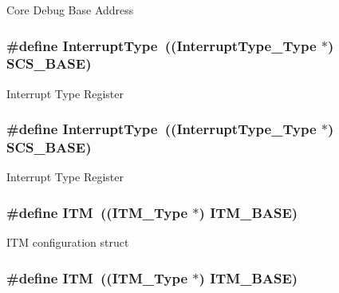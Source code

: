 Core Debug Base Address \hypertarget{group___c_m_s_i_s___c_m3__core__register_ga164238adbad56f07c7dd4e912af748dd}{
\subsubsection[{Interrupt\-Type}]{\setlength{\rightskip}{0pt plus 5cm}\#define Interrupt\-Type~(({\bf Interrupt\-Type\-\_\-\-Type} $\ast$) {\bf S\-C\-S\-\_\-\-B\-A\-S\-E})}}\label{group___c_m_s_i_s___c_m3__core__register_ga164238adbad56f07c7dd4e912af748dd}
Interrupt Type Register \hypertarget{group___c_m_s_i_s___c_m3__core__register_ga164238adbad56f07c7dd4e912af748dd}{
\subsubsection[{Interrupt\-Type}]{\setlength{\rightskip}{0pt plus 5cm}\#define Interrupt\-Type~(({\bf Interrupt\-Type\-\_\-\-Type} $\ast$) {\bf S\-C\-S\-\_\-\-B\-A\-S\-E})}}\label{group___c_m_s_i_s___c_m3__core__register_ga164238adbad56f07c7dd4e912af748dd}
Interrupt Type Register \hypertarget{group___c_m_s_i_s___c_m3__core__register_gabae7cdf882def602cb787bb039ff6a43}{
\subsubsection[{I\-T\-M}]{\setlength{\rightskip}{0pt plus 5cm}\#define I\-T\-M~(({\bf I\-T\-M\-\_\-\-Type} $\ast$)           {\bf I\-T\-M\-\_\-\-B\-A\-S\-E})}}\label{group___c_m_s_i_s___c_m3__core__register_gabae7cdf882def602cb787bb039ff6a43}
I\-T\-M configuration struct \hypertarget{group___c_m_s_i_s___c_m3__core__register_gabae7cdf882def602cb787bb039ff6a43}{
\subsubsection[{I\-T\-M}]{\setlength{\rightskip}{0pt plus 5cm}\#define I\-T\-M~(({\bf I\-T\-M\-\_\-\-Type} $\ast$)           {\bf I\-T\-M\-\_\-\-B\-A\-S\-E})}}\label{group___c_m_s_i_s___c_m3__core__register_gabae7cdf882def602cb787bb039ff6a43}

